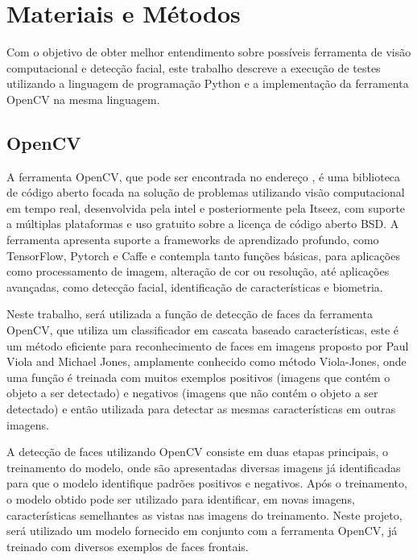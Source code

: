 \chapter{Materiais e Métodos}\label{cap:ferramentas}

Com o objetivo de obter melhor entendimento sobre possíveis ferramenta de visão computacional e detecção facial, este trabalho descreve a execução de testes utilizando a linguagem de programação Python e a implementação da ferramenta OpenCV na mesma linguagem.

\section{OpenCV}

A ferramenta OpenCV, que pode ser encontrada no endereço , é uma biblioteca de código aberto focada na solução de problemas utilizando visão computacional em tempo real, desenvolvida pela intel e posteriormente pela Itseez, com suporte a múltiplas plataformas e uso gratuito sobre a licença de código aberto BSD. A ferramenta apresenta suporte a frameworks de aprendizado profundo, como TensorFlow, Pytorch e Caffe e contempla tanto funções básicas, para aplicações como processamento de imagem, alteração de cor ou resolução, até aplicações avançadas, como detecção facial, identificação de características e biometria. \cite{wiki:OpenCV}

Neste trabalho, será utilizada a função de detecção de faces da ferramenta OpenCV, que utiliza um classificador em cascata baseado características, este é um método eficiente para reconhecimento de faces em imagens proposto por Paul Viola and Michael Jones, amplamente conhecido como método Viola-Jones, onde uma função é treinada com muitos exemplos positivos (imagens que contém o objeto a ser detectado) e negativos (imagens que não contém o objeto a ser detectado) e então utilizada para detectar as mesmas características em outras imagens. \cite{itseez2014theopencv}

A detecção de faces utilizando OpenCV consiste em duas etapas principais, o treinamento do modelo, onde são apresentadas diversas imagens já identificadas para que o modelo identifique padrões positivos e negativos. Após o treinamento, o modelo obtido pode ser utilizado para identificar, em novas imagens, características semelhantes as vistas nas imagens do treinamento. Neste projeto, será utilizado um modelo fornecido em conjunto com a ferramenta OpenCV, já treinado com diversos exemplos de faces frontais.


